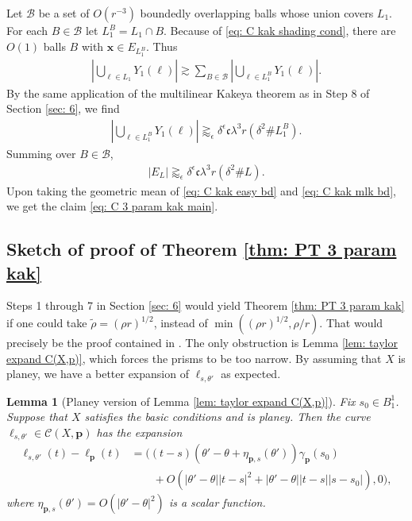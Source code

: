 \documentclass[12pt]{amsart}
\newcommand{\x}{{\bf{x}}}
\numberwithin{equation}{section}
\newtheorem{lemma}{Lemma}[section]
\newcommand{\1}{\mathbbm{1}}
\newcommand{\p}{\mathbf p}
\renewcommand{\x}{\mathbf x}
\begin{document}
Let $\mathcal B$ be a set of $O(r^{-3})$ boundedly overlapping balls whose union covers $L_1$. For each $B \in \mathcal B$ let $L_1^B = L_1 \cap B$. Because of \eqref{eq: C kak shading cond}, there are $O(1)$ balls $B$ with $\x \in E_{L_1^B}$. Thus 
\begin{align}
    |\bigcup_{\ell \in L_1} Y_1(\ell)| \gtrsim \sum_{B \in \mathcal B} |\bigcup_{\ell\in L_1^B} Y_1(\ell)|.
\end{align}
By the same application of the multilinear Kakeya theorem as in Step 8 of Section \ref{sec: 6}, we find 
\begin{align}\label{eq: C kak mlk in ball}
    |\bigcup_{\ell \in L_1^B} Y_1(\ell)| \gtrapprox_\epsilon \delta^\epsilon \mathfrak c \lambda^3 r (\delta^2 \# L_1^B). 
\end{align}
Summing over $B \in \mathcal B$, 
\begin{align}\label{eq: C kak mlk bd}
    |E_L| \gtrapprox_\epsilon \delta^\epsilon \mathfrak c \lambda^3 r (\delta^2 \# L). 
\end{align}
Upon taking the geometric mean of \eqref{eq: C kak easy bd} and \eqref{eq: C kak mlk bd}, we get the claim \eqref{eq: C 3 param kak main}. 

\subsection{Sketch of proof of Theorem \ref{thm: PT 3 param kak}}


Steps 1 through 7 in Section \ref{sec: 6} would yield Theorem \ref{thm: PT 3 param kak} if one could take $\tilde \rho = (\rho r)^{1/2}$, instead of $\min((\rho r)^{1/2}, \rho / r)$. That would precisely be the proof contained in \cite{KWZ}. The only obstruction is Lemma \ref{lem: taylor expand C(X,p)}, which forces the prisms to be too narrow. By assuming that $X$ is planey, we have a better expansion of $\ell_{s,\theta'}$ as expected.

\begin{lemma}[Planey version of Lemma \ref{lem: taylor expand C(X,p)}]\label{lem: planey taylor expand C(X,p)}
    Fix $s_0 \in B_1^1$.
    Suppose that $X$ satisfies the basic conditions and is planey. Then the curve $\ell_{s,\theta'} \in \mathcal C(X,\p)$ has the expansion 
    \begin{align}
        \ell_{s,\theta'}(t) - \ell_\p(t) &= ((t-s)(\theta' - \theta + \eta_{\p,s}(\theta')) \gamma_\p(s_0) \\ & \qquad+ O(|\theta' - \theta| |t - s|^2 + |\theta' - \theta| |t -s| |s -s_0|),0),\nonumber
    \end{align}
    where $\eta_{\p,s}(\theta') = O(|\theta' - \theta|^2)$ is a scalar function.
\end{lemma}
\end{document}
